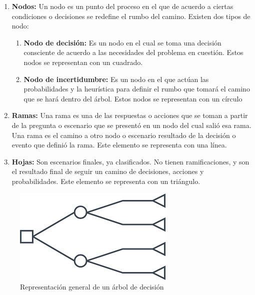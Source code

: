 \begin{enumerate}
	\item \textbf{Nodos:} Un nodo es un punto del proceso en el que de acuerdo a ciertas condiciones o decisiones se redefine el rumbo del camino. Existen dos tipos de nodo:
	\begin{enumerate}
		\item \textbf{Nodo de decisión:} Es un nodo en el cual se toma una decisión consciente de acuerdo a las necesidades del problema en cuestión. Estos nodos se representan con un cuadrado.
		\item \textbf{Nodo de incertidumbre: } Es un nodo en el que actúan las probabilidades y la heurística para definir el rumbo que tomará el camino que se hará dentro del árbol. Estos nodos se representan con un círculo
	\end{enumerate}
	\item \textbf{Ramas:} Una rama es una de las respuestas o acciones que se toman a partir de la pregunta o escenario que se presentó en un nodo del cual salió esa rama. Una rama es el camino a otro nodo o escenario resultado de la decisión o evento que definió la rama. Este elemento se representa con una línea.
	\item \textbf{Hojas:} Son escenarios finales, ya clasificados. No tienen ramificaciones, y son el resultado final de seguir un camino de decisiones, acciones y probabilidades. Este elemento se representa con un triángulo.
\end{enumerate}

\newpage
\begin{figure}[!htbp]
	\hypertarget{fig:arbol-decision-ejemplo}{\hspace{1pt}}
	\begin{center}
		\includegraphics[height=0.3\textheight]{capitulo2/images/arbol-decision-ejemplo.png}
		\caption{Representación general de un árbol de decisión}
		\label{fig:arbol-decision-ejemplo}
	\end{center}
\end{figure}

